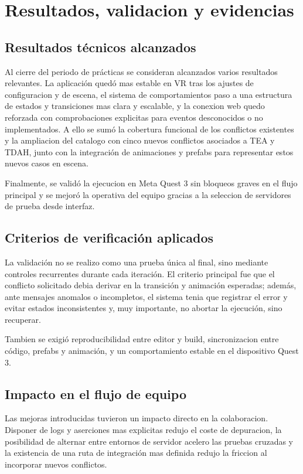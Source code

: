 \section{Resultados, validacion y evidencias}

\subsection{Resultados técnicos alcanzados}
Al cierre del periodo de prácticas se consideran alcanzados varios resultados relevantes. La aplicación quedó mas estable en VR tras los ajustes de configuracion y de escena, el sistema de comportamientos paso a una estructura de estados y transiciones mas clara y escalable, y la conexion web quedo reforzada con comprobaciones explicitas para eventos desconocidos o no implementados. A ello se sumó la cobertura funcional de los conflictos existentes y la ampliacion del catalogo con cinco nuevos conflictos asociados a TEA y TDAH, junto con la integración de animaciones y prefabs para representar estos nuevos casos en escena.\par

Finalmente, se validó la ejecucion en Meta Quest 3 sin bloqueos graves en el flujo principal y se mejoró la operativa del equipo gracias a la seleccion de servidores de prueba desde interfaz.\par

\subsection{Criterios de verificación aplicados}
La validación no se realizo como una prueba única al final, sino mediante controles recurrentes durante cada iteración. El criterio principal fue que el conflicto solicitado debia derivar en la transición y animación esperadas; además, ante mensajes anomalos o incompletos, el sistema tenia que registrar el error y evitar estados inconsistentes y, muy importante, no abortar la ejecución, sino recuperar.\par

Tambien se exigió reproducibilidad entre editor y build, sincronizacion entre código, prefabs y animación, y un comportamiento estable en el dispositivo Quest 3.\par

\subsection{Impacto en el flujo de equipo}
Las mejoras introducidas tuvieron un impacto directo en la colaboracion. Disponer de logs y aserciones mas explicitas redujo el coste de depuracion, la posibilidad de alternar entre entornos de servidor acelero las pruebas cruzadas y la existencia de una ruta de integración mas definida redujo la friccion al incorporar nuevos conflictos.\par


